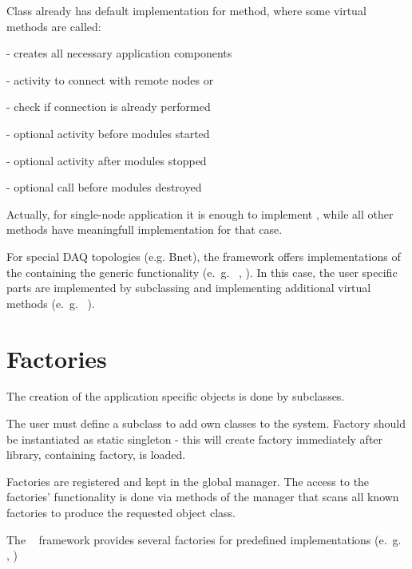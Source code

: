 Class  already has default implementation for
 method, where some virtual methods are called:

\bdes
\item[\func{CreateAppModules()}] - creates all necessary application components
\item[\func{ConnectAppModules()}] - activity to connect with remote nodes or  
\item[\func{IsAppModulesConnected()}] - check if connection is already performed  
\item[\func{BeforeAppModulesStarted()}] - optional activity before modules started 
\item[\func{AfterAppModulesStopped()}] - optional activity after modules stopped
\item[\func{BeforeAppModulesDestroyed()}] - optional call before modules destroyed
\edes

Actually, for single-node application it is enough to implement ,
while all other methods have meaningfull implementation for that case. 

For special DAQ topologies (e.g. Bnet), the framework offers 
implementations of the  containing the 
generic functionality (e.~g.~ , ). 
In this case, the user specific parts are implemented by subclassing 
and implementing additional virtual methods (e.~g.~ ).    



\section{Factories}
\label{prog_plugin_factory}

The creation of the application specific objects is done by  subclasses.

The user must define a  
subclass to add own classes to the system.
Factory should be instantiated as static singleton - this will create factory  
immediately after library, containing factory, is loaded. 

Factories are registered and kept in the global manager. 
The access to the factories' functionality is done via methods of the
manager that scans all known factories to produce the requested object class. 

The \dabc~ framework provides several factories for predefined 
implementations (e.~g.~ , )


